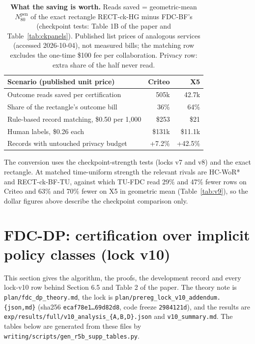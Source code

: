 \documentclass[sigconf,anonymous,review]{acmart}
\newcommand{\Npen}{N_{80}^{\text{pen}}}
\begin{document}
\begin{table}[H]
\caption{\textbf{What the saving is worth.} Reads saved = geometric-mean $\Npen$ of the exact rectangle RECT-ck-HG minus FDC-BF's (checkpoint tests: Table 1B of the paper and Table~\ref{tab:ckpanels}). Published list prices of analogous services (accessed 2026-10-04), not measured bills; the matching row excludes the one-time \$100 fee per collaboration. Privacy row: extra share of the half never read.}
\label{tab:cost}
\footnotesize
\setlength{\tabcolsep}{3pt}
\begin{tabular}{@{}lrr@{}}
\toprule
Scenario (published unit price) & Criteo & X5 \\
\midrule
Outcome reads saved per certification & 505k & 42.7k \\
Share of the rectangle's outcome bill & 36\% & 64\% \\
Rule-based record matching, \$0.50 per 1,000 & \$253 & \$21 \\
Human labels, \$0.26 each & \$131k & \$11.1k \\
Records with untouched privacy budget & +7.2\% & +42.5\% \\
\bottomrule
\end{tabular}
\end{table}

\noindent The conversion uses the checkpoint-strength tests (locks v7 and v8) and the exact rectangle. At matched time-uniform strength the relevant rivals are HC-WoR* and RECT-ck-BF-TU, against which TU-FDC read 29\% and 47\% fewer rows on Criteo and 63\% and 70\% fewer on X5 in geometric mean (Table~\ref{tab:v9}), so the dollar figures above describe the checkpoint comparison only.

\section{FDC-DP: certification over implicit policy classes (lock v10)}\label{app:fdcdp}

This section gives the algorithm, the proofs, the development record and every lock-v10 row behind Section 6.5 and Table 2 of the paper. The theory note is \texttt{plan/fdc\_dp\_theory.md}, the lock is \texttt{plan/prereg\_lock\_v10\_addendum.\{json,md\}} (sha256 \texttt{ecaf78e1\dots69d82d8}, code freeze \texttt{2984121d}), and the results are \texttt{exp/results/full/v10\_analysis\_\{A,B,D\}.json} and \texttt{v10\_summary.md}. The tables below are generated from these files by \texttt{writing/scripts/gen\_r5b\_supp\_tables.py}.
\end{document}
